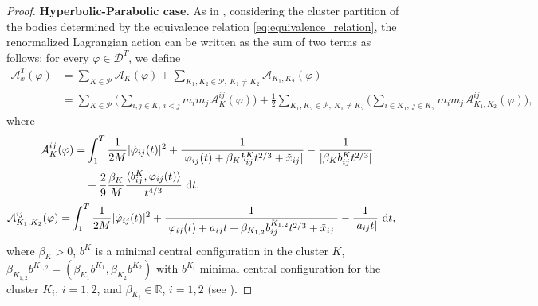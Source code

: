 \documentclass[a4paper,10pt]{amsart}
\newcommand{\numberset}{\mathbb}
\newcommand{\R}{\numberset{R}}
\newcommand{\ud}{\mathrm{d}}
\theoremstyle{plain}
\theoremstyle{definition}
\numberwithin{equation}{section}
\numberwithin{thm}{section}
\begin{document}
\begin{proof}
\smallskip
{\bf Hyperbolic-Parabolic case.} As in \cite[Section 5]{PolimeniTerracini}, considering the cluster partition of the bodies determined by the equivalence relation \eqref{eq:equivalence_relation}, the renormalized Lagrangian action can be written as the sum of two terms as follows: for every $\varphi\in \mathcal{D}^T$, we define
\begin{equation}\label{def:decomposed_lagrangian_action}
\begin{split}
    \mathcal{A}_{x}^T(\varphi) & = \sum_{K\in\mathcal{P}} \mathcal{A}_{K}(\varphi) + \sum_{K_1,K_2\in\mathcal{P},\ K_1\neq K_2} \mathcal{A}_{K_1,K_2}(\varphi)\\
    &  = \sum_{K\in\mathcal{P}}\bigg(\sum_{i,j\in K,\ i<j} m_i m_j \mathcal{A}_{K}^{ij}(\varphi)\bigg) + \frac{1}{2}\sum_{K_1,K_2\in\mathcal{P},\ K_1\neq K_2}\bigg(\sum_{i\in K_1,\ j\in K_2} m_i m_j \mathcal{A}_{K_1,K_2}^{ij}(\varphi)\bigg),
\end{split}
\end{equation}
where
\begin{displaymath}\label{action_partially_hyperbolic_inside}
\begin{split}
    \mathcal{A}_{K}^{ij}(\varphi) = & \int_{1}^{T} \frac{1}{2M} |\dot{\varphi}_{ij}(t)|^2 + \frac{1}{|\varphi_{ij}(t)+\beta_K b^K_{ij}t^{2/3}+\Tilde{x}_{ij}|} - \frac{1}{|\beta_K b^K_{ij}t^{2/3}|} \\
    &+ \frac{2}{9}\frac{\beta_K}{M} \frac{\langle b^K_{ij},\varphi_{ij}(t)\rangle}{t^{4/3}}\ \ud t,
\end{split}
\end{displaymath}
\begin{displaymath}\label{action_partially_hyperbolic_outside}
\begin{split}
    \mathcal{A}_{K_1,K_2}^{ij}(\varphi) = &\int_{1}^{T}\frac{1}{2M} |\dot{\varphi}_{ij}(t)|^2+ \frac{1}{|\varphi_{ij}(t)+a_{ij}t+\beta_{K_{1,2}}b_{ij}^{K_{1,2}}t^{2/3}+\Tilde{x}_{ij}|} - \frac{1}{|a_{ij}t|}\ \ud t,
\end{split}
\end{displaymath}
where $\beta_K >0$, $b^K$ is a minimal central configuration in the cluster $K$, $\beta_{K_{1,2}}b^{K_{1,2}}=(\beta_{K_1}b^{K_1},\beta_{K_2}b^{K_2})$ with $b^{K_i}$ minimal central configuration for the cluster $K_i$, $i=1,2$, and $\beta_{K_i}\in\R$, $i=1,2$ (see \cite[Section 5]{PolimeniTerracini}).


\end{proof}
\end{document}
